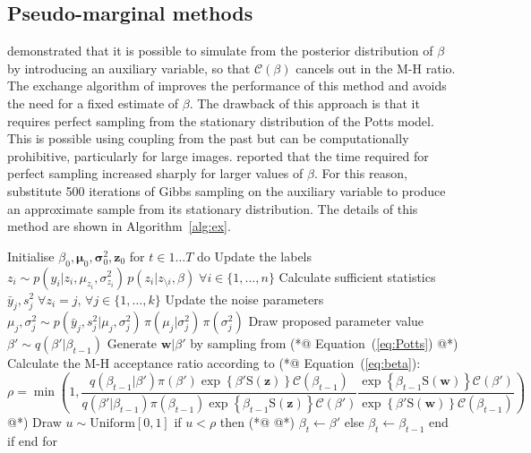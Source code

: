 \documentclass[nojss,shortnames]{jss}\usepackage[]{graphicx}\usepackage[]{color}
\begin{document}
\subsection{Pseudo-marginal methods}
  \citet{Moeller2006} demonstrated that it is possible to simulate from the posterior distribution of $\beta$ by introducing an auxiliary variable, so that $\mathcal{C}(\beta)$ cancels out in the M-H ratio. The exchange algorithm of \citet{Murray2006} improves the performance of this method and avoids the need for a fixed estimate of $\beta$. The drawback of this approach is that it requires perfect sampling from the stationary distribution of the Potts model. This is possible using coupling from the past \citep{Propp1996,Huber2016} but can be computationally prohibitive, particularly for large images. \citet{McGrory2009} reported that the time required for perfect sampling increased sharply for larger values of $\beta$. For this reason, \citet{Cucala2009} substitute 500 iterations of Gibbs sampling on the auxiliary variable to produce an approximate sample from its stationary distribution. The details of this method are shown in Algorithm~\ref{alg:ex}.
  
\begin{algorithm}[float,caption={Approximate exchange algorithm (AEA)}, label={alg:ex}]
Initialise $\beta_0, \boldsymbol\mu_0, \boldsymbol\sigma^2_0, \mathbf{z}_0$
for $t \in 1\dots T$ do
  Update the labels $z_i \sim p(y_i | z_i, \mu_{z_i}, \sigma^2_{z_i}) \,p(z_i | z_{\setminus i}, \beta) \; \forall i \in \{ 1, \dots, n\}$
  Calculate sufficient statistics $\bar{y}_j, s^2_j \; \forall z_i = j, \, \forall j \in \{ 1, \dots, k\}$
  Update the noise parameters $\mu_j, \sigma^2_j \sim p(\bar{y}_j, s^2_j | \mu_j, \sigma_j^2) \,\pi(\mu_j | \sigma^2_j) \, \pi(\sigma^2_j)$
  Draw proposed parameter value $\beta' \sim q(\beta' | \beta_{t-1})$
  Generate $\mathbf{w}|\beta'$ by sampling from (*@ Equation~(\ref{eq:Potts}) @*)
  Calculate the M-H acceptance ratio according to (*@ Equation~(\ref{eq:beta}): 
  \begin{equation}
  \label{eq:mhRatio_ex}
  \rho =  \min\left( 1, \frac{q(\beta_{t-1}|\beta') \pi(\beta') \exp\left\{ \beta' \mathrm{S}(\mathbf{z}) \right\} \mathcal{C}(\beta_{t-1})}{q(\beta'|\beta_{t-1}) \pi(\beta_{t-1}) \exp\left\{ \beta_{t-1} \mathrm{S}(\mathbf{z}) \right\} \mathcal{C}(\beta')} \frac{\exp\left\{ \beta_{t-1} \mathrm{S}(\mathbf{w}) \right\} \mathcal{C}(\beta')}{\exp\left\{ \beta' \mathrm{S}(\mathbf{w}) \right\} \mathcal{C}(\beta_{t-1})} \right)
  \end{equation} @*)
  Draw $u \sim \mathrm{Uniform}[0,1]$
  if $u < \rho$ then (*@ \label{mh:accept} @*)
    $\beta_t \gets \beta'$ 
  else
    $\beta_t \gets \beta_{t-1}$ 
  end if
end for
\end{algorithm}
\end{document}
